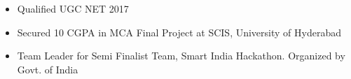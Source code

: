 {}
\divider

\smallskip
\begin{itemize}
\item Qualified UGC NET 2017
\smallskip
\item Secured 10 CGPA in MCA Final Project at SCIS, University of Hyderabad
\smallskip
\item Team Leader for Semi Finalist Team, Smart India Hackathon. Organized by Govt. of India
\smallskip
\end{itemize}


